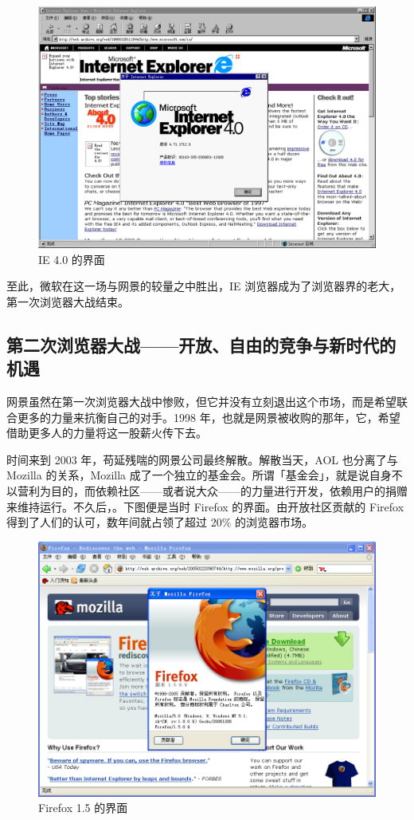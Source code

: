 \begin{figure}[htb!]
  \centering
  \includegraphics[width=.75\textwidth]{assets/software/IE4.png}
  \caption{IE 4.0 的界面}
  \label{fig:IE4}
\end{figure}

至此，微软在这一场与网景的较量之中胜出，IE 浏览器成为了浏览器界的老大，第一次浏览器大战结束。

\subsection[第二次浏览器大战——开放、自由的竞争与新时代的机遇]{第二次浏览器大战{\normalsize ——开放、自由的竞争与新时代的机遇}}

网景虽然在第一次浏览器大战中惨败，但它并没有立刻退出这个市场，而是希望联合更多的力量来抗衡自己的对手。1998 年，也就是网景被收购的那年，它，希望借助更多人的力量将这一股薪火传下去。

时间来到 2003 年，苟延残喘的网景公司最终解散。解散当天，AOL 也分离了与 Mozilla 的关系，Mozilla 成了一个独立的基金会。所谓「基金会」，就是说自身不以营利为目的，而依赖社区——或者说大众——的力量进行开发，依赖用户的捐赠来维持运行。不久后，。下图便是当时 Firefox 的界面。由开放社区贡献的 Firefox 得到了人们的认可，数年间就占领了超过 20\% 的浏览器市场。

\begin{figure}[htb!]
  \centering
  \includegraphics[width=.6\textwidth]{assets/software/Firefox_1.5.png}
  \caption{Firefox 1.5 的界面}
  \label{fig:Firefox_1.5}
\end{figure}

